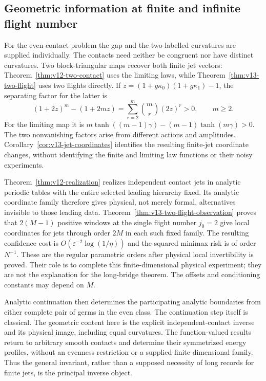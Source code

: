 \subsection{Geometric information at finite and infinite flight number}
For the even-contact problem the gap and the two labelled curvatures
are supplied individually. The contacts need neither be congruent nor
have distinct curvatures. Two block-triangular maps recover both finite
jet vectors: Theorem~\ref{thm:v12-two-contact} uses the limiting laws,
while Theorem~\ref{thm:v13-two-flight} uses two flights directly.
If $z=(1+g\kappa_0)(1+g\kappa_1)-1$, the separating factor for the
latter is
\[
 (1+2z)^m-(1+2mz)=\sum_{r=2}^m\binom mr(2z)^r>0,
                         \qquad m\ge2.
\]
For the limiting map it is
$m\tanh((m-1)\gamma)-(m-1)\tanh(m\gamma)>0$.
The two nonvanishing factors arise from different actions and
amplitudes. Corollary~\ref{cor:v13-jet-coordinates} identifies the
resulting finite-jet coordinate changes, without identifying the
finite and limiting law functions or their noisy experiments.

Theorem~\ref{thm:v12-realization} realizes independent contact jets in
analytic periodic tables with the entire selected leading hierarchy
fixed. Its analytic coordinate family therefore gives physical,
not merely formal, alternatives invisible to those leading data.
Theorem~\ref{thm:v13-two-flight-observation} proves that $2(M-1)$
positive windows at the single flight number $j_0=2$ give local
coordinates for jets through order $2M$ in each such fixed family.
The resulting confidence cost is $O(\varepsilon^{-2}\log(1/\eta))$
and the squared minimax risk is of order $N^{-1}$. These are the
regular parametric orders after physical local invertibility is
proved. Their role is to complete this finite-dimensional physical
experiment; they are not the explanation for the long-bridge theorem.
The offsets and conditioning constants may depend on $M$.

Analytic continuation then determines the participating analytic
boundaries from either complete pair of germs in the even class.
The continuation step itself is classical. The geometric content here
is the explicit independent-contact inverse and its physical image,
including equal curvatures. The function-valued results return to
arbitrary smooth contacts and determine their symmetrized energy
profiles, without an evenness restriction or a supplied finite-dimensional
family. Thus the general invariant, rather than a supposed necessity
of long records for finite jets, is the principal inverse object.

